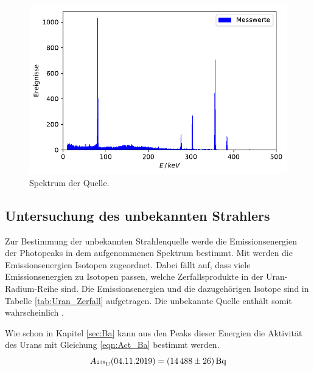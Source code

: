 \begin{figure}[H]
  \centering
  \includegraphics[width=.9\textwidth]{../Plots/Ba_Spektrum.pdf}
  \caption{Spektrum der  Quelle.}
  \label{fig:Ba_Spektrum}
\end{figure}

\subsection{Untersuchung des unbekannten Strahlers}

Zur Bestimmung der unbekannten Strahlenquelle werde die Emissionsenergien der Photopeaks in dem aufgenommenen Spektrum bestimmt.
Mit \cite{Isotopenbestimmung} werden die Emissionsenergien Isotopen zugeordnet.
Dabei fällt auf, dass viele Emissionsenergien zu Isotopen passen, welche Zerfallsprodukte in der Uran-Radium-Reihe sind. Die Emissionsenergien und die dazugehörigen Isotope sind in Tabelle \ref{tab:Uran_Zerfall} aufgetragen.
Die unbekannte Quelle enthält somit wahrscheinlich .

Wie schon in Kapitel \ref{sec:Ba} kann aus den Peaks dieser Energien die Aktivität des Urans mit Gleichung \eqref{eqn:Act_Ba} bestimmt werden.
\begin{equation}
  A_\text{\ce{^238U}}(04.11.2019) = \SI{14488(26)}{\becquerel}
\end{equation}


